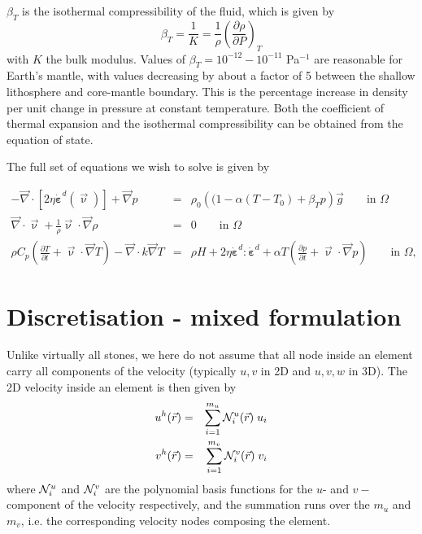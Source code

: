 \documentclass[a4paper,12pt]{article}
\begin{document}
$\beta_T$ is the isothermal compressibility of the fluid, which is given by 
\[
\beta_T = \frac{1}{K} = \frac{1}{\rho}\left( \frac{\partial \rho}{\partial P} \right)_T
\]
with $K$ the bulk modulus. 
Values of $\beta_T=10^{-12}-10^{-11}$ Pa$^{-1}$ are reasonable for Earth's mantle, with values decreasing by about a
factor of 5 between the shallow lithosphere and core-mantle boundary.
This is the percentage increase in density per unit change in pressure at constant temperature.
Both the coefficient of thermal expansion and the isothermal compressibility can be obtained
from the equation of state.

The full set of equations we wish to solve is given by

\begin{eqnarray}
-\vec\nabla \cdot \left[2\eta \dot{\bm \varepsilon}^d({\vec\upnu}) \right] + \vec \nabla p &=& \rho_0 \left((1 - \alpha(T-T_0) + \beta_T p \right) {\vec g} \quad\quad \textrm{in $\Omega$}  \label{eq:stokes-1a_} \\
\vec\nabla \cdot {\vec\upnu} + \frac{1}{\rho} {\vec\upnu} \cdot {\vec \nabla}\rho&=&0 \quad\quad  \textrm{in $\Omega$}   \label{eq:stokes-2a_} \\
\rho C_p \left(\frac{\partial T}{\partial t} + \vec{\upnu}\cdot \vec\nabla T\right) - \vec\nabla\cdot k\vec\nabla T   &=& 
  \rho H  +  2\eta \dot{\bm \varepsilon}^d : \dot{\bm \varepsilon}^d    +\alpha T \left( \frac{\partial p}{\partial t}+  \vec{\upnu} \cdot \vec\nabla p \right) 
\quad\quad   \textrm{in $\Omega$},
  \label{eq:temperature_}
\end{eqnarray}


\section{Discretisation - mixed formulation}


Unlike virtually all stones, we here do not assume that all node inside an element carry all components of the 
velocity (typically $u,v$ in 2D and $u,v,w$ in 3D).
The 2D velocity inside an element is then given by 
\begin{eqnarray}
u^h({\vec r}) &=& \sum_{i=1}^{m_u} {\mathcal{N}}_i^u({\vec r})\;  u_i \\
v^h({\vec r}) &=& \sum_{i=1}^{m_v} {\mathcal{N}}_i^v({\vec r})\;  v_i
\end{eqnarray}
where ${\mathcal{N}}_i^u$ and ${\mathcal{N}}_i^v$ are the polynomial basis functions for the $u$- and $v-$component of the velocity
respectively, and the summation runs over the $m_u$ and $m_v$, i.e. the corresponding velocity nodes composing the element.
\end{document}
